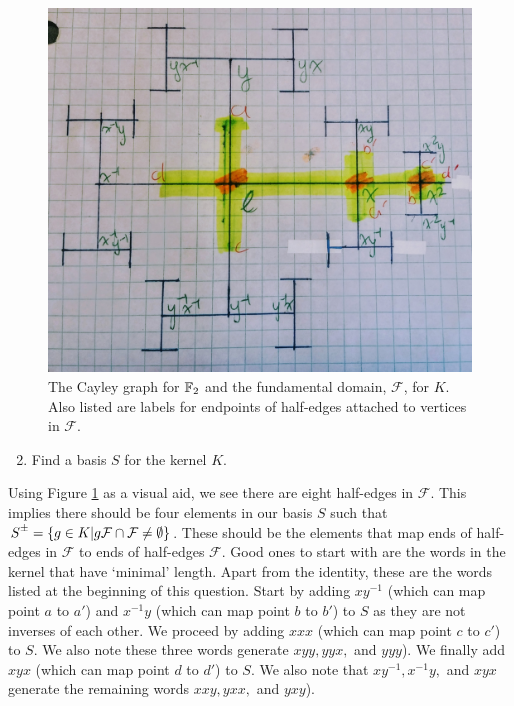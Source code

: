 \begin{figure}[ht]
    \centering
    \includegraphics[width=1.0\textwidth]{images/fundamental_domain_for_K.jpg}
    \caption{The Cayley graph for $\mathbb{F}_2$ and the fundamental domain, $\mathcal{F}$, for $K$. Also listed are labels for endpoints of half-edges attached to vertices in $\mathcal{F}$.}
    \label{fig:fun_domain_of_K}
\end{figure}

\begin{enumerate}
  \setcounter{enumi}{1}
  \item Find a basis $S$ for the kernel $K$.
\end{enumerate}

Using Figure \ref{fig:fun_domain_of_K} as a visual aid, we see there are eight half-edges in $\mathcal{F}$. This implies there should be four elements in our basis $S$ such that $S^{\rpm}=\left\{g\in K | g\mathcal{F} \cap \mathcal{F} \neq \emptyset \right\}$. These should be the elements that map ends of half-edges in $\mathcal{F}$ to ends of half-edges $\mathcal{F}$.  Good ones to start with are the words in the kernel that have `minimal' length. Apart from the identity, these are the words listed at the beginning of this question. Start by adding $xy^{-1}$ (which can map point $a$ to $a'$) and $x^{-1}y$ (which can map point $b$ to $b'$) to $S$ as they are not inverses of each other. We proceed by adding $xxx$ (which can map point $c$ to $c'$) to $S$. We also note these three words generate $xyy, yyx,$ and $yyy$). We finally add $xyx$ (which can map point $d$ to $d'$) to $S$. We also note that $xy^{-1}, x^{-1}y,$ and $xyx$  generate the remaining words $xxy, yxx,$ and $yxy$). 

